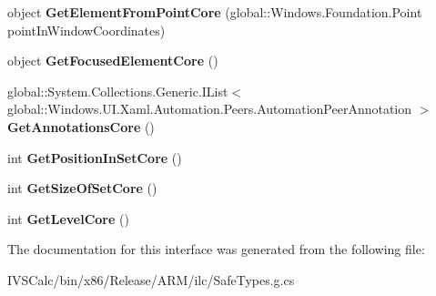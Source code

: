 \begin{DoxyCompactItemize}
object {\bfseries Get\+Element\+From\+Point\+Core} (global\+::\+Windows.\+Foundation.\+Point point\+In\+Window\+Coordinates)
\item 
\mbox{\label{interface_windows_1_1_u_i_1_1_xaml_1_1_automation_1_1_peers_1_1_i_automation_peer_overrides3_a85c5473c92efce557199ce1f32af01fc}} 
object {\bfseries Get\+Focused\+Element\+Core} ()
\item 
\mbox{\label{interface_windows_1_1_u_i_1_1_xaml_1_1_automation_1_1_peers_1_1_i_automation_peer_overrides3_aa6a79c57927a7424350ddd2c262d71c2}} 
global\+::\+System.\+Collections.\+Generic.\+I\+List$<$ global\+::\+Windows.\+U\+I.\+Xaml.\+Automation.\+Peers.\+Automation\+Peer\+Annotation $>$ {\bfseries Get\+Annotations\+Core} ()
\item 
\mbox{\label{interface_windows_1_1_u_i_1_1_xaml_1_1_automation_1_1_peers_1_1_i_automation_peer_overrides3_afef3ad83240660e412bb003fdb94af98}} 
int {\bfseries Get\+Position\+In\+Set\+Core} ()
\item 
\mbox{\label{interface_windows_1_1_u_i_1_1_xaml_1_1_automation_1_1_peers_1_1_i_automation_peer_overrides3_a3ca3266f1f29e7576d6e7037cb4e1d77}} 
int {\bfseries Get\+Size\+Of\+Set\+Core} ()
\item 
\mbox{\label{interface_windows_1_1_u_i_1_1_xaml_1_1_automation_1_1_peers_1_1_i_automation_peer_overrides3_a52902ce9fb7640616f2937232f64cb71}} 
int {\bfseries Get\+Level\+Core} ()
\end{DoxyCompactItemize}


The documentation for this interface was generated from the following file\+:\begin{DoxyCompactItemize}
\item 
I\+V\+S\+Calc/bin/x86/\+Release/\+A\+R\+M/ilc/Safe\+Types.\+g.\+cs\end{DoxyCompactItemize}
